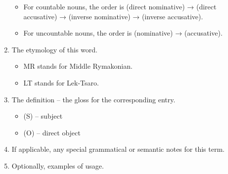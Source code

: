 \documentclass{book}
\begin{document}
\begin{enumerate}
    \begin{itemize}
      \item For countable nouns, the order is (direct nominative) → (direct accusative) → (inverse nominative) → (inverse accusative).
      \item For uncountable nouns, the order is (nominative) → (accusative).
    \end{itemize}
    \item The etymology of this word.
    \begin{itemize}
      \item MR stands for Middle Rymakonian.
      \item LT stands for Lek-Tsaro.
    \end{itemize}
    \item The definition -- the gloss for the corresponding entry.
    \begin{itemize}
        \item (S) -- subject
        \item (O) -- direct object
    \end{itemize}
    \item If applicable, any special grammatical or semantic notes for this term.
    \item Optionally, examples of usage.
\end{enumerate}

\begin{multicols}{2}
    
\end{multicols}
\end{document}
